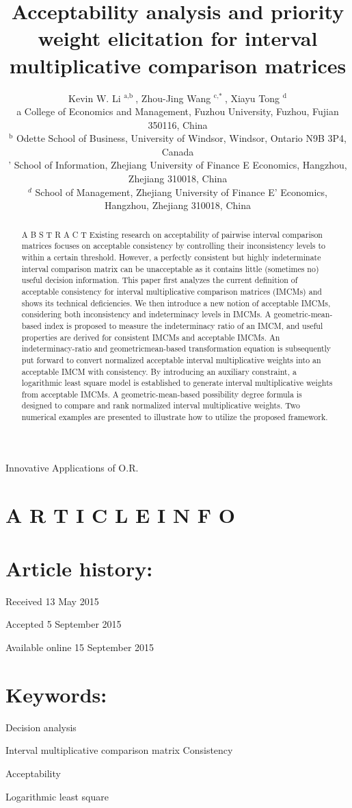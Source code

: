 \documentclass[10pt]{article}
\title{Acceptability analysis and priority weight elicitation for interval multiplicative comparison matrices }
\author{Kevin W. Li ${ }^{\text {a,b }}$, Zhou-Jing Wang ${ }^{\text {c,* }}$, Xiayu Tong ${ }^{\mathrm{d}}$\\
a College of Economics and Management, Fuzhou University, Fuzhou, Fujian 350116, China\\
${ }^{\mathrm{b}}$ Odette School of Business, University of Windsor, Windsor, Ontario N9B 3P4, Canada\\
' School of Information, Zhejiang University of Finance E Economics, Hangzhou, Zhejiang 310018, China\\
${ }^{d}$ School of Management, Zhejiang University of Finance E' Economics, Hangzhou, Zhejiang 310018, China}
\date{}
\begin{document}
\maketitle
Innovative Applications of O.R.



\section*{A R T I C L E I N F O}
\section*{Article history:}
Received 13 May 2015

Accepted 5 September 2015

Available online 15 September 2015

\section*{Keywords:}
Decision analysis

Interval multiplicative comparison matrix Consistency

Acceptability

Logarithmic least square

\begin{abstract}
A B S T R A C T Existing research on acceptability of pairwise interval comparison matrices focuses on acceptable consistency by controlling their inconsistency levels to within a certain threshold. However, a perfectly consistent but highly indeterminate interval comparison matrix can be unacceptable as it contains little (sometimes no) useful decision information. This paper first analyzes the current definition of acceptable consistency for interval multiplicative comparison matrices (IMCMs) and shows its technical deficiencies. We then introduce a new notion of acceptable IMCMs, considering both inconsistency and indeterminacy levels in IMCMs. A geometric-mean-based index is proposed to measure the indeterminacy ratio of an IMCM, and useful properties are derived for consistent IMCMs and acceptable IMCMs. An indeterminacy-ratio and geometricmean-based transformation equation is subsequently put forward to convert normalized acceptable interval multiplicative weights into an acceptable IMCM with consistency. By introducing an auxiliary constraint, a logarithmic least square model is established to generate interval multiplicative weights from acceptable IMCMs. A geometric-mean-based possibility degree formula is designed to compare and rank normalized interval multiplicative weights. Two numerical examples are presented to illustrate how to utilize the proposed framework.
\end{abstract}
\end{document}
